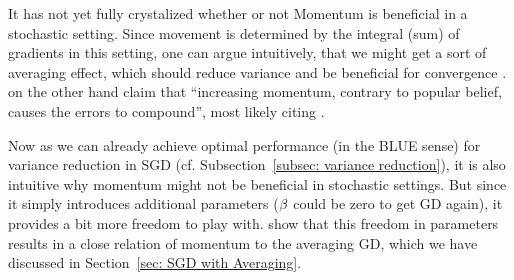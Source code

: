 It has not yet fully crystalized whether or not Momentum is beneficial in a
stochastic setting. Since movement is determined by the integral (sum) of
gradients in this setting, one can argue intuitively, that we might get a sort
of averaging effect, which should reduce variance and be beneficial for convergence
\parencite[e.g.][p. 69]{bottouOptimizationMethodsLargeScale2018}. \textcite{gohWhyMomentumReally2017}
on the other hand claim that ``increasing momentum, contrary to popular
belief, causes the errors to compound'', most likely citing
\textcite{devolderFirstorderMethodsSmooth2014}.

Now as we can already achieve optimal performance (in the BLUE sense) for
variance reduction in SGD (cf. Subsection~\ref{subsec: variance reduction}),
it is also intuitive why momentum might not be beneficial in stochastic settings.
But since it simply introduces additional parameters (\(\beta\) could be zero
to get GD again), it provides a bit more freedom to play with.
\textcite{flammarionAveragingAccelerationThere2015} show that this freedom in
parameters results in a close relation of momentum to the averaging GD, which
we have discussed in Section~\ref{sec: SGD with Averaging}.


